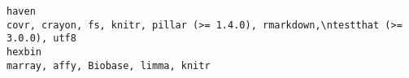 \documentclass[
  letterpaper,
  DIV=11,
  numbers=noendperiod]{scrreprt}
\begin{document}
\begin{verbatim}
haven                                                                                                                                                                                                                                                                                                                                                                                                                                                                                                                                                                                                                                                                                                                                                                                                                                                                                                                                                                                                                                                                                                                                                                                                                       covr, crayon, fs, knitr, pillar (>= 1.4.0), rmarkdown,\ntestthat (>= 3.0.0), utf8
hexbin                                                                                                                                                                                                                                                                                                                                                                                                                                                                                                                                                                                                                                                                                                                                                                                                                                                                                                                                                                                                                                                                                                                                                                                                                                                                    marray, affy, Biobase, limma, knitr

\end{verbatim}
\end{document}
